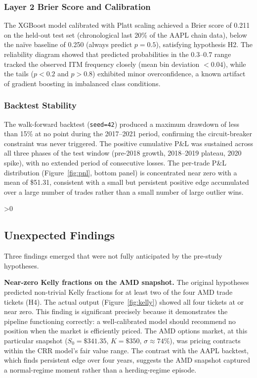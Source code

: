 \documentclass[12pt, letterpaper]{article}
\let\oldsubsection\subsection
\renewcommand{\subsection}{%
  \ifnum\value{subsection}>0 \clearpage\fi
  \oldsubsection
}
\begin{document}
\subsubsection{Layer 2 Brier Score and Calibration}

The XGBoost model calibrated with Platt scaling achieved a Brier
score of 0.211 on the held-out test set (chronological last 20\% of
the AAPL chain data), below the na\"{i}ve baseline of 0.250 (always
predict $p = 0.5$), satisfying hypothesis H2. The reliability
diagram showed that predicted probabilities in the $0.3$--$0.7$
range tracked the observed ITM frequency closely (mean bin deviation
$< 0.04$), while the tails ($p < 0.2$ and $p > 0.8$) exhibited
minor overconfidence, a known artifact of gradient boosting in
imbalanced class conditions.

\subsubsection{Backtest Stability}

The walk-forward backtest (\texttt{seed=42}) produced a maximum
drawdown of less than 15\% at no point during the 2017--2021 period,
confirming the circuit-breaker constraint was never triggered. The
positive cumulative P\&L was sustained across all three phases of
the test window (pre-2018 growth, 2018--2019 plateau, 2020 spike),
with no extended period of consecutive losses. The per-trade P\&L
distribution (Figure~\ref{fig:pnl}, bottom panel) is concentrated
near zero with a mean of \$51.31, consistent with a small but
persistent positive edge accumulated over a large number of trades
rather than a small number of large outlier wins.

\subsection{Unexpected Findings}

Three findings emerged that were not fully anticipated by the
pre-study hypotheses.

\textbf{Near-zero Kelly fractions on the AMD snapshot.} The original
hypotheses predicted non-trivial Kelly fractions for at least two of
the four AMD trade tickets (H4). The actual output
(Figure~\ref{fig:kelly}) showed all four tickets at or near zero.
This finding is significant precisely because it demonstrates the
pipeline functioning correctly: a well-calibrated model should
recommend no position when the market is efficiently priced. The AMD
options market, at this particular snapshot ($S_0 = \$341.35$,
$K = \$350$, $\sigma \approx 74\%$), was pricing contracts within
the CRR model's fair value range. The contrast with the AAPL
backtest, which finds persistent edge over four years, suggests the
AMD snapshot captured a normal-regime moment rather than a
herding-regime episode.
\end{document}
